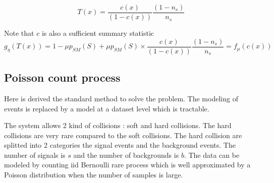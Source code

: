 \begin{equation}
	T(x) = \frac{c(x)}{(1-c(x))} \frac{(1-n_s)}{n_s} 
\end{equation}


Note that $c$ is also a sufficient summary statistic
\begin{equation}
	g_\eta(T(x)) = 1 - \mu p_{SM}(S) + \mu p_{SM}(S) \times \frac{c(x)}{(1-c(x))} \frac{(1-n_s)}{n_s} = f_\mu(c(x))
\end{equation}












\subsection{Poisson count process} %
\label{sub:poisson_count_process}

Here is derived the standard method to solve the problem.
The modeling of events is replaced by a model at a dataset level which is tractable.

The system allows 2 kind of collisions : soft and hard collisions.
The hard collisions are very rare compared to the soft collisions.
The hard collision are splitted into 2 categories the signal events and the background events.
The number of signals is $s$ and the number of backgrounds is $b$.
The data can be modeled by counting iid Bernoulli rare process which is well approximated by a Poisson distribution \needcite when the number of samples is large.



